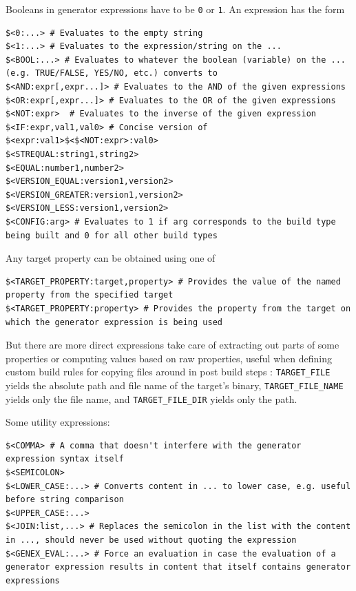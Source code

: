 \documentclass[table, xcdraw]{article}%
\begin{document}
Booleans in generator expressions have to be \texttt{0} or \texttt{1}. An expression has the form %

\begin{verbatim}
$<0:...> # Evaluates to the empty string
$<1:...> # Evaluates to the expression/string on the ...
$<BOOL:...> # Evaluates to whatever the boolean (variable) on the ... (e.g. TRUE/FALSE, YES/NO, etc.) converts to
$<AND:expr[,expr...]> # Evaluates to the AND of the given expressions
$<OR:expr[,expr...]> # Evaluates to the OR of the given expressions
$<NOT:expr>  # Evaluates to the inverse of the given expression
$<IF:expr,val1,val0> # Concise version of $<expr:val1>$<$<NOT:expr>:val0>
$<STREQUAL:string1,string2>
$<EQUAL:number1,number2>
$<VERSION_EQUAL:version1,version2>
$<VERSION_GREATER:version1,version2>
$<VERSION_LESS:version1,version2>
$<CONFIG:arg> # Evaluates to 1 if arg corresponds to the build type being built and 0 for all other build types
\end{verbatim}

Any target property can be obtained using one of

\begin{verbatim}
$<TARGET_PROPERTY:target,property> # Provides the value of the named property from the specified target
$<TARGET_PROPERTY:property> # Provides the property from the target on which the generator expression is being used
\end{verbatim}

But there are more direct expressions take care of extracting out parts of some properties or computing values based on raw properties, useful when defining custom build rules for copying files around in post build steps : \texttt{TARGET_FILE} yields the absolute path and file name of the target’s binary, \texttt{TARGET_FILE_NAME} yields only the file name, and \texttt{TARGET_FILE_DIR} yields only the path.

Some utility expressions:

\begin{verbatim}
$<COMMA> # A comma that doesn't interfere with the generator expression syntax itself
$<SEMICOLON>
$<LOWER_CASE:...> # Converts content in ... to lower case, e.g. useful before string comparison
$<UPPER_CASE:...>
$<JOIN:list,...> # Replaces the semicolon in the list with the content in ..., should never be used without quoting the expression
$<GENEX_EVAL:...> # Force an evaluation in case the evaluation of a generator expression results in content that itself contains generator expressions
\end{verbatim}
\end{document}
